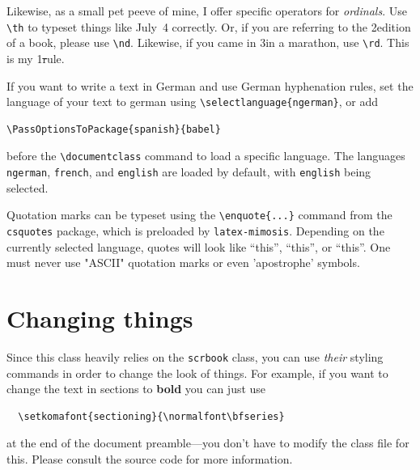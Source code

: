 Likewise, as a small pet peeve of mine, I offer specific operators for
\emph{ordinals}. Use \verb|\th| to typeset things like July~4\th
correctly. Or, if you are referring to the 2\nd edition of a book,
please use \verb|\nd|. Likewise, if you came in 3\rd in a marathon, use
\verb|\rd|. This is my 1\st rule.

If you want to write a text in German and use German hyphenation rules, set the language of your text to german using \verb|\selectlanguage{ngerman}|, or add
\begin{verbatim}
\PassOptionsToPackage{spanish}{babel}
\end{verbatim}
before the \verb|\documentclass| command to load a specific language. The languages \verb|ngerman|, \verb|french|, and \verb|english| are loaded by default, with \verb|english| being selected.

Quotation marks can be typeset using the \verb|\enquote{...}| command from the \verb|csquotes| package, which is preloaded by \verb|latex-mimosis|.
Depending on the currently selected language, quotes will look like \enquote{this},
\enquote{this},
or
\enquote{this}.
One must never use "ASCII" quotation marks or even 'apostrophe' symbols.

\section{Changing things}

Since this class heavily relies on the \verb|scrbook| class, you can use
\emph{their} styling commands in order to change the look of things. For
example, if you want to change the text in sections to \textbf{bold} you
can just use
%
\begin{verbatim}
  \setkomafont{sectioning}{\normalfont\bfseries}
\end{verbatim}
%
at the end of the document preamble---you don't have to modify the class
file for this. Please consult the source code for more information.
